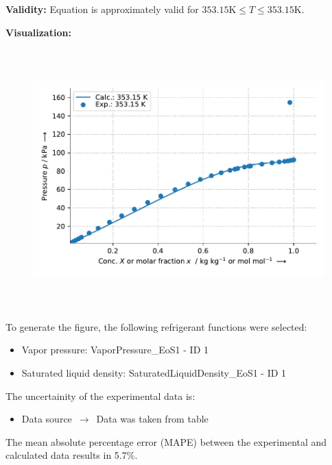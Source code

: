 \textbf{Validity:}
\newline
Equation is approximately valid for $353.15 \si{\kelvin} \leq T \leq 353.15 \si{\kelvin}$.
\newline

\textbf{Visualization:}
%
\begin{figure}[!htp]
{\noindent\includegraphics[height=10cm, keepaspectratio]{figs/abs/abs_2-Propanol_ionic_liquid_[EMIM]+[(CF3SO2)2N]-_UniquacFixedDu_2.pdf}}
\end{figure}
%

To generate the figure, the following refrigerant functions were selected:
\begin{itemize}
\item Vapor pressure: VaporPressure\_EoS1 - ID 1
\item Saturated liquid density: SaturatedLiquidDensity\_EoS1 - ID 1
\end{itemize}

The uncertainity of the experimental data is:
\begin{itemize}
\item Data source $\,\to\,$ Data was taken from table
\end{itemize}

The mean absolute percentage error (MAPE) between the experimental and calculated data results in 5.7\%.
\FloatBarrier
\newpage
